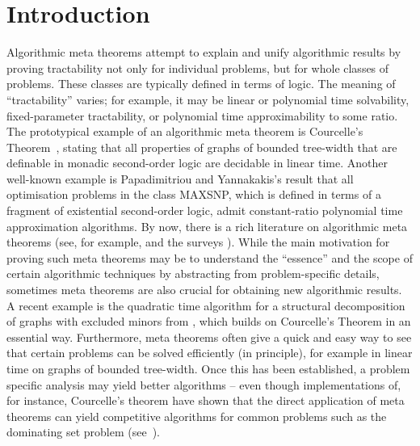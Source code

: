 \documentclass[11pt]{article}
\numberwithin{equation}{section}
\begin{document}
\section{Introduction}

Algorithmic meta theorems attempt to explain and unify algorithmic
results by proving tractability not only for individual problems, but
for whole classes of problems. These classes are typically defined in
terms of logic. The meaning of ``tractability'' varies; for example,
it may be linear or polynomial time solvability, fixed-parameter
tractability, or polynomial time approximability to some ratio. The
prototypical example of an algorithmic meta theorem is Courcelle's
Theorem~\cite{cou90}, stating that all properties of graphs of bounded
tree-width that are definable in monadic second-order logic are
decidable in linear time. Another well-known example is Papadimitriou
and Yannakakis's \cite{papyan91} result that all optimisation problems
in the class MAXSNP, which is defined in terms of a fragment of
existential second-order logic, admit constant-ratio polynomial time
approximation algorithms. By now, there is a rich literature on
algorithmic meta theorems (see, for example,
\cite{bodfomlok+09,coumakrot00,coumakrot01,dawgrokre07,
  dawgrokre+06,dvokratho10,frigro01,kretaz10a,kretaz10,see96} and the
surveys \cite{gro07b,grokre11,kre11}).  While the main motivation for
proving such meta theorems may be to understand the ``essence'' and
the scope of certain algorithmic techniques by abstracting from
problem-specific details, sometimes meta theorems are also crucial for
obtaining new algorithmic results. A recent example is the quadratic
time algorithm for a structural decomposition of graphs with excluded
minors from \cite{grokawree13}, which builds on Courcelle's Theorem in
an essential way. Furthermore, meta theorems often give a quick and
easy way to see that certain problems can be solved efficiently (in
principle), for example in linear time on graphs of bounded
tree-width. Once this has been established, a problem specific
analysis may yield better algorithms -- even though implementations
of, for instance, Courcelle's theorem have shown that the direct
application of meta theorems
can yield competitive algorithms for common problems such as the
dominating set problem (see~\cite{LangerRRS12}).
\end{document}
